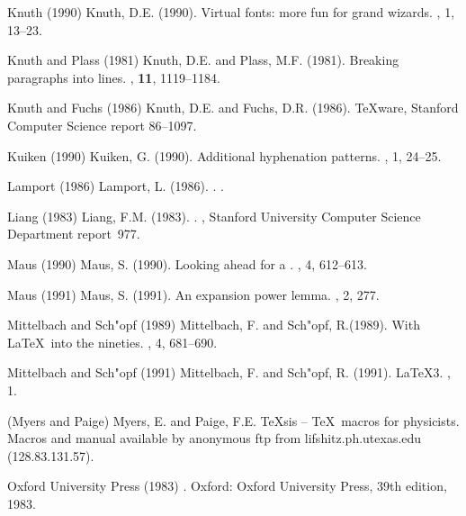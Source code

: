 \item[K:virt] Knuth (1990)
Knuth, D.E. (1990).
Virtual fonts: more fun for grand wizards.
, 1, 13--23.

\item[K:break] Knuth and Plass (1981)
Knuth, D.E. and Plass, M.F. (1981).
Breaking paragraphs into lines. ,
{\bf 11}, 1119--1184.

\item[K:Fuchs] Knuth and Fuchs (1986)
Knuth, D.E. and Fuchs, D.R. (1986).
{\italic \TeX ware}, Stanford Computer Science report 86--1097.

\item[Vas:add] Kuiken (1990)
 Kuiken, G. (1990).
Additional hyphenation patterns. , 1, 24--25.

\item[LL] Lamport (1986)
 Lamport, L. (1986).
.
\AW.

\item[Liang] Liang (1983)
Liang, F.M. (1983). 
.
\PhD, Stanford University
Computer Science Department report~977.

\item[Maus] Maus (1990)
 Maus, S. (1990). Looking ahead for a .
, 4, 612--613.

\item[Maus2] Maus (1991)
 Maus, S. (1991). An expansion power lemma.
, 2, 277.

\item[Frank] Mittelbach and Sch"opf (1989)
 Mittelbach, F. and  Sch"opf, R.(1989).
With \LaTeX\ into the nineties. , 4, 
681--690.

\item[Frank2] Mittelbach and Sch"opf (1991)
 Mittelbach, F. and  Sch"opf, R. (1991).
\LaTeX3. , 1.

\item[TeXsis] (Myers and Paige)
 Myers, E. and Paige, F.E.
{\italic \TeX sis -- \TeX\ macros for physicists}.
Macros and manual
available by anonymous ftp from 
lifshitz.ph.utexas.edu (128.83.131.57).

\item[Hart] Oxford University Press (1983)
. Oxford: Oxford University Press,
39th edition, 1983.

